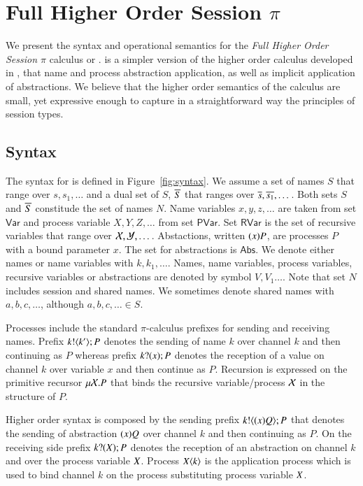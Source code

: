 \section{Full Higher Order Session $\pi$}

We present the syntax and operational semantics for the
{\em Full Higher Order Session $\pi$} calculus or \fHOp.
\fHOp is a simpler version of the higher order calculus developed
in \cite{tlca07}, that name and process abstraction application, as
well as implicit application of abstractions. We believe that
the higher order semantics of the calculus are small, yet expressive
enough to capture in a straightforward way the principles of
session types.

\subsection{\fHOp Syntax}

The syntax for \fHOp is defined in Figure~\ref{fig:syntax}.
We assume a set of names $S$ that range over $s, s_1, \dots$
and a dual set of $S$, $\overline{S}$ that ranges over $\overline{s}, \overline{s_1}, \dots$.
Both sets $S$ and $\overline{S}$ constitude the set of names $N$.
Name variables $x, y, z, \dots$ are taken from set $\mathsf{Var}$ and
process variable $X, Y, Z, \dots$ from set $\mathsf{PVar}$. 
Set $\mathsf{RVar}$ is the set of recursive 
variables that range over $\mathcal{X}, \mathcal{Y}, \dots$.
Abstactions, written $(x)P$, are processes $P$ with a bound parameter $x$.
The set for abstractions is $\mathsf{Abs}$.
We denote either names or name variables with $k, k_1, \dots$.
Names, name variables, process variables, recursive variables or abstractions
are denoted by symbol $V, V_1 \dots$.
Note that set $N$ includes session and shared names.
We sometimes denote shared names with $a,b, c, \dots$, although $a, b, c, \dots \in S$.

Processes include the standard $\pi$-calculus prefixes for sending and receiving names.
Prefix $k ! \langle k' \rangle ; P$ denotes the sending of name $k$ over channel $k$ and then
continuing as $P$ whereas prefix $k ? (x) ; P$ denotes the reception of a value
on channel $k$ over variable $x$ and then continue as $P$. Recursion is expressed
on the primitive recursor $\mu \mathcal{X}. P$ that binds the recursive variable/process
$\mathcal{X}$ in the structure of $P$.

Higher order syntax is composed by the sending prefix $k ! \langle (x)Q \rangle ; P$ that
denotes the sending of abstraction $(x)Q$ over channel $k$ and then continuing
as $P$. On the receiving side prefix $k ? (X) ; P$ denotes the reception of an abstraction
on channel $k$ and over the process variable $X$. Process $X\langle k \rangle$ is the application
process which is used to bind channel $k$ on the process substituting process variable $X$.

